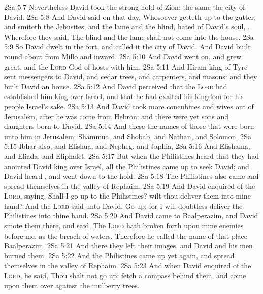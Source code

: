 \vs 2Sa 5:7 Nevertheless David took the strong hold of Zion: the same  the city of David.
\vs 2Sa 5:8 And David said on that day, Whosoever getteth up to the gutter, and smiteth the Jebusites, and the lame and the blind,  hated of David's soul, . Wherefore they said, The blind and the lame shall not come into the house.
\vs 2Sa 5:9 So David dwelt in the fort, and called it the city of David. And David built round about from Millo and inward.
\vs 2Sa 5:10 And David went on, and grew great, and the \textsc{Lord} God of hosts  with him.
\vs 2Sa 5:11 And Hiram king of Tyre sent messengers to David, and cedar trees, and carpenters, and masons: and they built David an house.
\vs 2Sa 5:12 And David perceived that the \textsc{Lord} had established him king over Israel, and that he had exalted his kingdom for his people Israel's sake.
\vs 2Sa 5:13 And David took  more concubines and wives out of Jerusalem, after he was come from Hebron: and there were yet sons and daughters born to David.
\vs 2Sa 5:14 And these  the names of those that were born unto him in Jerusalem; Shammua, and Shobab, and Nathan, and Solomon,
\vs 2Sa 5:15 Ibhar also, and Elishua, and Nepheg, and Japhia,
\vs 2Sa 5:16 And Elishama, and Eliada, and Eliphalet.
\vs 2Sa 5:17 But when the Philistines heard that they had anointed David king over Israel, all the Philistines came up to seek David; and David heard , and went down to the hold.
\vs 2Sa 5:18 The Philistines also came and spread themselves in the valley of Rephaim.
\vs 2Sa 5:19 And David enquired of the \textsc{Lord}, saying, Shall I go up to the Philistines? wilt thou deliver them into mine hand? And the \textsc{Lord} said unto David, Go up: for I will doubtless deliver the Philistines into thine hand.
\vs 2Sa 5:20 And David came to Baalperazim, and David smote them there, and said, The \textsc{Lord} hath broken forth upon mine enemies before me, as the breach of waters. Therefore he called the name of that place Baalperazim.
\vs 2Sa 5:21 And there they left their images, and David and his men burned them.
\vs 2Sa 5:22 And the Philistines came up yet again, and spread themselves in the valley of Rephaim.
\vs 2Sa 5:23 And when David enquired of the \textsc{Lord}, he said, Thou shalt not go up;  fetch a compass behind them, and come upon them over against the mulberry trees.
